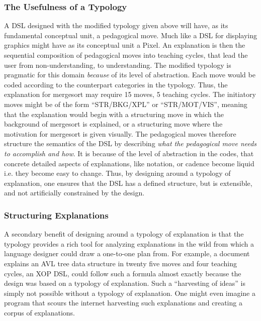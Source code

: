 \documentclass[conference]{IEEEtran}
\begin{document}
\subsubsection{The Usefulness of a Typology}
A DSL designed with the modified typology given above will have, as its
fundamental conceptual unit, a pedagogical move. Much like a DSL for displaying
graphics might have as its conceptual unit a Pixel. An explanation is then the
sequential composition of pedagogical moves into teaching cycles, that lead the
user from non-understanding, to understanding. The modified typology is
pragmatic for this domain \emph{because} of its level of abstraction. Each move
would be coded according to the counterpart categories in the typology. Thus,
the explanation for mergesort may require 15 moves, 5 teaching cycles. The
initiatory moves might be of the form ``STR/BKG/XPL'' or ``STR/MOT/VIS'',
meaning that the explanation would begin with a structuring move in which the
background of mergesort is explained, or a structuring move where the motivation
for mergesort is given visually. The pedagogical moves therefore
structure the semantics of the DSL by describing \emph{what the pedagogical move needs to
  accomplish and how}. It is because of the level of abstraction in the codes,
that concrete detailed aspects of explanations, like notation, or cadence
become liquid i.e. they become easy to change. Thus, by designing around a
typology of explanation, one ensures that the DSL has a defined structure, but
is extensible, and not artificially constrained by the design.

\subsubsection{Structuring Explanations}
A secondary benefit of designing around a typology of explanation is that the
typology provides a rich tool for analyzing explanations in the wild from which
a language designer could draw a one-to-one plan from. For example, a document
explains an AVL tree data structure in twenty five moves and four teaching
cycles, an XOP DSL, could follow such a formula almost exactly because the
design was based on a typology of explanation. Such a ``harvesting of ideas'' is
simply not possible without a typology of explanation. One might even imagine a
program that scours the internet harvesting such explanations and creating a
corpus of explanations.
\end{document}
